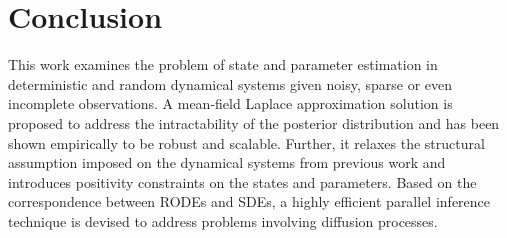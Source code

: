 \chapter{Conclusion}
\label{ch-conclusion}

This work examines the problem of state and parameter estimation in deterministic and random dynamical systems given noisy, sparse or even incomplete observations.
A mean-field Laplace approximation solution is proposed to address the intractability of the posterior distribution and has been shown empirically to be robust and scalable.
Further, it relaxes the structural assumption imposed on the dynamical systems from previous work and introduces positivity constraints on the states and parameters.
Based on the correspondence between RODEs and SDEs, a highly efficient parallel inference technique is devised to address problems involving diffusion processes.
